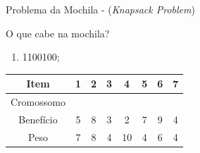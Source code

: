 \documentclass[mathserif, 10pt]{beamer}
\begin{document}
\begin{frame}{Problema da Mochila - (\textit{Knapsack Problem})}
	\begin{block}{O que cabe na mochila?}
		\begin{enumerate}
			\item [b)] 1100100;
		\end{enumerate}
	\end{block}
	\vspace{2mm}
	
	\centering
	\begin{tabular}{|c|c|c|c|c|c|c|c|}
		\hline
		Item & 1 & 2 & 3 & 4 & 5 & 6 & 7 \\
		\hline
		Cromossomo &  &  &  &  &  &  &  \\
		\hline
		Benefício & 5 & 8 & 3 & 2 & 7 & 9 & 4 \\
		\hline
		Peso & 7 & 8 & 4 & 10 & 4 & 6 & 4 \\
		\hline
	\end{tabular}
	\vspace{2mm}
	
	\begin{itemize}
	\end{itemize}
\end{frame}
\end{document}
